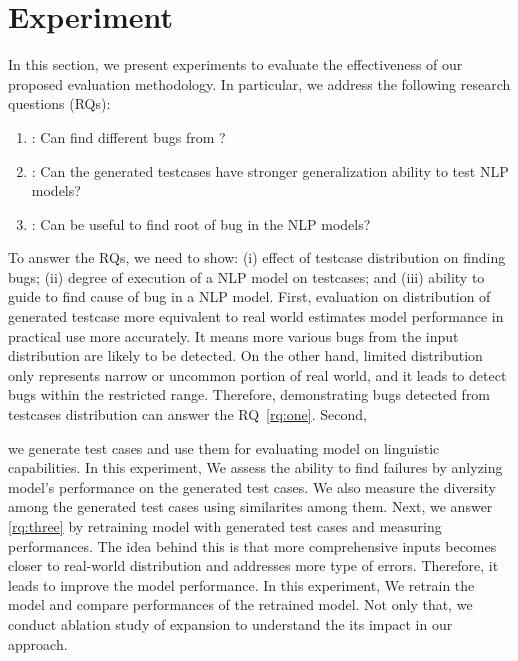 \section{Experiment}
\label{sec:experiment}
%


In this section, we present experiments to evaluate the effectiveness
of our proposed evaluation methodology. In particular, we address the
following research questions (RQs):

\begin{enumerate}[label=\textbf{RQ\arabic*}]
\item \label{rq:one}: Can \tool find different bugs from \Cklst?
\item \label{rq:two}: Can the \tool generated testcases have stronger
  generalization ability to test NLP models?
\item \label{rq:three}: Can \tool be useful to find root of bug in the
  NLP models?
\end{enumerate}

To answer the RQs, we need to show: (i) effect of testcase
distribution on finding bugs; (ii) degree of execution of a NLP model
on testcases; and (iii) ability to guide to find cause of bug in a NLP
model. First, evaluation on distribution of generated testcase more
equivalent to real world estimates model performance in practical use
more accurately. It means more various bugs from the input
distribution are likely to be detected.  On the other hand, limited
distribution only represents narrow or uncommon portion of real world,
and it leads to detect bugs within the restricted range. Therefore,
demonstrating bugs detected from testcases distribution can answer the
RQ~\ref{rq:one}. Second, 


we generate test cases
and use them for evaluating model on linguistic capabilities. In this
experiment, We assess the ability to find failures by anlyzing model's
performance on the generated test cases. We also measure the diversity
among the generated test cases using similarites among them. Next, we
answer \ref{rq:three} by retraining \sa model with generated test
cases and measuring performances. The idea behind this is that more
comprehensive inputs becomes closer to real-world distribution and
addresses more type of errors.  Therefore, it leads to improve the
model performance. In this experiment, We retrain the model and
compare performances of the retrained model. Not only that, we conduct
ablation study of \cfg expansion to understand the its impact in our
approach.

